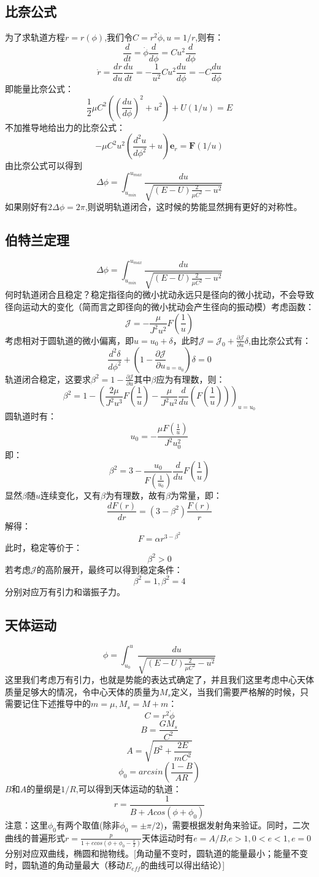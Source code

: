 \documentclass[a4paper, 10pt, openany]{book}%
\begin{document}
    \subsection{比奈公式}
    为了求轨道方程$r=r(\phi)$,我们令$C=r^2\dot{\phi},u=1/r$,则有：
    $$\frac{d}{dt}=\dot{\phi}\frac{d}{d\phi}=Cu^2\frac{d}{d\phi}$$
    $$\dot{r}=\frac{dr}{du}\frac{du}{dt}=-\frac{1}{u^2}Cu^2\frac{du}{d\phi}=-C\frac{du}{d\phi}$$
    即能量比奈公式：
    $$\frac{1}{2}\mu C^2((\frac{du}{d\phi})^2+u^2)+U(1/u)=E$$
    不加推导地给出力的比奈公式：
    $$-\mu C^2u^2(\frac{d^2u}{d\phi^2}+u)\textbf{e}_r=\textbf{F}(1/u)$$
    由比奈公式可以得到
    $$\Delta \phi=\int_{u_{min}}^{u_{max}}\frac{du}{\sqrt{(E-U)\frac{2}{\mu C^2}-u^2}}$$
    如果刚好有$2\Delta \phi=2\pi$,则说明轨道闭合，这时候的势能显然拥有更好的对称性。
    \subsection{伯特兰定理}
     $$\Delta \phi=\int_{u_{min}}^{u_{max}}\frac{du}{\sqrt{(E-U)\frac{2}{\mu C^2}-u^2}}$$
    何时轨道闭合且稳定？稳定指径向的微小扰动永远只是径向的微小扰动，不会导致径向运动大的变化（简而言之即径向的微小扰动会产生径向的振动模）考虑函数：
    $$\mathcal{J}=-\frac{\mu}{J^2u^2}F(\frac{1}{u})$$
    考虑相对于圆轨道的微小偏离，即$u=u_0+\delta$，此时$\mathcal{J}=\mathcal{J}_0+\frac{\partial \mathcal{J}}{\partial u}\delta$,由比奈公式有：
    $$\frac{d^2\delta}{d\phi^2}+(1-\frac{\partial \mathcal{J}}{\partial u}_{u=u_0})\delta=0$$
    轨道闭合稳定，这要求$\beta^2=1-\frac{\partial \mathcal{J}}{\partial u}$其中$\beta$应为有理数，则：
    $$\beta^2=1-(\frac{2\mu}{J^2u^3}F(\frac{1}{u})-\frac{\mu}{J^2u^2}\frac{d}{du}(F(\frac{1}{u})))_{u=u_0}$$
    圆轨道时有：
    $$u_0=-\frac{\mu F(\frac{1}{u})}{J^2u^2_0}$$
    即：
    $$\beta^2=3-\frac{u_0}{F(\frac{1}{u_0})}\frac{d}{du}F(\frac{1}{u})$$
    显然$\beta$随$u$连续变化，又有$\beta$为有理数，故有$\beta$为常量，即：
    $$\frac{dF(r)}{dr}=(3-\beta^2)\frac{F(r)}{r}$$
    解得：
    $$F=\alpha r^{3-\beta^2}$$
    此时，稳定等价于：
    $$\beta^2>0$$
    若考虑$\mathcal{J}$的高阶展开，最终可以得到稳定条件：
    $$\beta^2=1,\beta^2=4$$
    分别对应万有引力和谐振子力。
    \subsection{天体运动}
    $$\phi=\int_{u_0}^{u}\frac{du}{\sqrt{(E-U)\frac{2}{\mu C^2}-u^2}}$$
    这里我们考虑万有引力，也就是势能的表达式确定了，并且我们这里考虑中心天体质量足够大的情况，令中心天体的质量为$M_s$定义，当我们需要严格解的时候，只需要记住下述推导中的$m=\mu,M_s=M+m$：
    $$C=r^2\dot{\phi}$$
    $$B=\frac{GM_s}{C^2}$$
    $$A=\sqrt{B^2+\frac{2E}{mC^2}}$$
    $$\phi_0=arcsin(\frac{1-B}{AR})$$
    $B$和$A$的量纲是$1/R$,可以得到天体运动的轨道：
    $$r=\frac{1}{B+Acos(\phi+\phi_0)}$$
    注意：这里$\phi_0$有两个取值(除非$\phi_0=\pm\pi/2$)，需要根据发射角来验证。同时，二次曲线的普遍形式$r=\frac{p}{1+ecos({\phi+\phi_0-\frac{\pi}{2}})}$天体运动时有$e=A/B$,$e>1,0<e<1,e=0$分别对应双曲线，椭圆和抛物线。[角动量不变时，圆轨道的能量最小；能量不变时，圆轨道的角动量最大（移动$E_{eff}$的曲线可以得出结论）]
\end{document}
